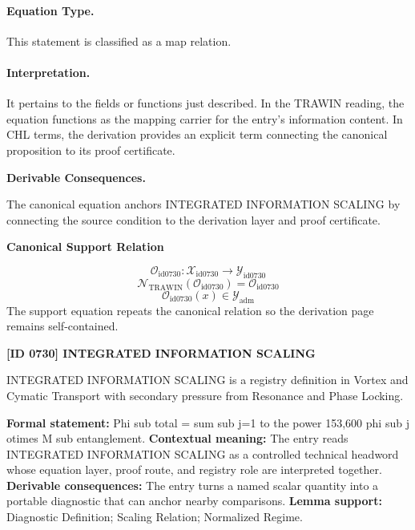 \paragraph{Equation Type.}
This statement is classified as a map relation.

\paragraph{Interpretation.}
It pertains to the fields or functions just described. In the TRAWIN reading, the equation functions as the mapping carrier for the entry’s information content. In CHL terms, the derivation provides an explicit term connecting the canonical proposition to its proof certificate.

\par\vspace{0.35em}
\noindent\textbf{Derivable Consequences.}\quad
\begingroup
\footnotesize
\raggedright
The canonical equation anchors INTEGRATED INFORMATION SCALING by connecting the source condition to the derivation layer and proof certificate.
\par\endgroup

\noindent\textbf{Canonical Support Relation}\par
\[
\mathcal{O}_{\mathrm{id0730}}:\mathcal{X}_{\mathrm{id0730}}\longrightarrow\mathcal{Y}_{\mathrm{id0730}}
\]
\[
\mathcal{N}_{\mathrm{TRAWIN}}(\mathcal{O}_{\mathrm{id0730}})=\mathcal{O}_{\mathrm{id0730}}
\]
\[
\mathcal{O}_{\mathrm{id0730}}(x)\in\mathcal{Y}_{\mathrm{adm}}
\]
\noindent The support equation repeats the canonical relation so the derivation page remains self-contained.\par

\clearpage
\noindent\textbf{[ID 0730] INTEGRATED INFORMATION SCALING}\par
\vspace{0.35em}
\begingroup\small
{}
INTEGRATED INFORMATION SCALING is a registry definition in Vortex and Cymatic Transport with secondary pressure from Resonance and Phase Locking.

\begingroup\footnotesize\setlength{\emergencystretch}{3em}\sloppy
\textbf{Formal statement:} Phi sub total = sum sub j=1 to the power 153,600 phi sub j otimes M sub entanglement. \textbf{Contextual meaning:} The entry reads INTEGRATED INFORMATION SCALING as a controlled technical headword whose equation layer, proof route, and registry role are interpreted together. \textbf{Derivable consequences:} The entry turns a named scalar quantity into a portable diagnostic that can anchor nearby comparisons. \textbf{Lemma support:} Diagnostic Definition; Scaling Relation; Normalized Regime.\par
\endgroup

